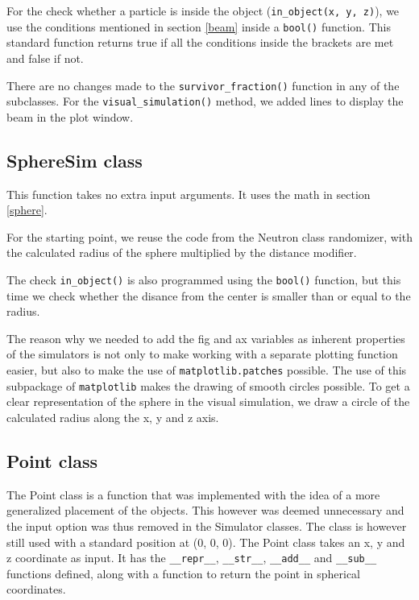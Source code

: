 For the check whether a particle is inside the object (\lstinline[language=PythonPlus, style=colorEX]|in_object(x, y, z)|), we use the conditions mentioned in section \ref{beam} inside a \lstinline[language=PythonPlus, style=colorEX]|bool()| function. This standard function returns true if all the conditions inside the brackets are met and false if not.

There are no changes made to the \lstinline[language=PythonPlus, style=colorEX]|survivor_fraction()| function in any of the subclasses. For the \lstinline[language=PythonPlus, style=colorEX]|visual_simulation()| method, we added lines to display the beam in the plot window.

\subsection{SphereSim class}
This function takes no extra input arguments. It uses the math in section \ref{sphere}. 

For the starting point, we reuse the code from the Neutron class randomizer, with the calculated radius of the sphere multiplied by the distance modifier.

The check \lstinline[language=PythonPlus, style=colorEX]|in_object()| is also programmed using the \lstinline[language=PythonPlus, style=colorEX]|bool()| function, but this time we check whether the disance from the center is smaller than or equal to the radius.

The reason why we needed to add the fig and ax variables as inherent properties of the simulators is not only to make working with a separate plotting function easier, but also to make the use of \lstinline[language=PythonPlus, style=colorEX]|matplotlib.patches| possible. The use of this subpackage of \lstinline[language=PythonPlus, style=colorEX]|matplotlib| makes the drawing of smooth circles possible. To get a clear representation of the sphere in the visual simulation, we draw a circle of the calculated radius along the x, y and z axis.
\subsection{Point class}
The Point class is a function that was implemented with the idea of a more generalized placement of the objects. This however was deemed unnecessary and the input option was thus removed in the Simulator classes. The class is however still used with a standard position at (0, 0, 0). 
The Point class takes an x, y and z coordinate as input. It has the \lstinline[language=PythonPlus, style=colorEX]|__repr__|, \lstinline[language=PythonPlus, style=colorEX]|__str__|, \lstinline[language=PythonPlus, style=colorEX]|__add__| and \lstinline[language=PythonPlus, style=colorEX]|__sub__| functions defined, along with a function to return the point in spherical coordinates.


